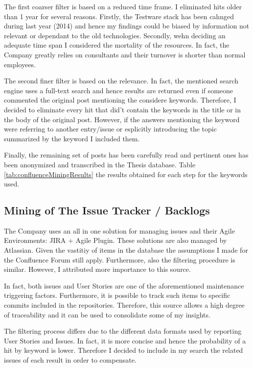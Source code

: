 The first coarser filter is based on a reduced time frame. I eliminated hits older than 1 year for several reasons. Firstly, the Testware stack has been cahnged during last year (2014) and hence my findings could be biased by information not relevant or dependant to the old technologies. Secondly, wehn deciding an adequate time span I considered the mortality of the resources. In fact, the Company greatly relies on consultants and their turnover is shorter than normal employees.

The second finer filter is based on the relevance. In fact, the mentioned search engine uses a full-text search and hence results are returned even if someone commented the original post mentioning the considere keywords. Therefore, I decided to eliminate every hit that did't contain the keywords in the title or in the body of the original post. However, if the answers mentioning the keyword were referring to another entry/issue or esplicitly introducing the topic summarized by the keyword I included them.

Finally, the remaining set of posts has been carefully read and pertinent ones has been anonymized and transcribed in the Thesis database. Table \ref{tab:confluenceMiningResults} the results obtained for each step for the keywords used.



\subsection{Mining of The Issue Tracker / Backlogs}

The Company uses an all in one solution for managing issues and their Agile Environments: JIRA + Agile Plugin. These solutions are also managed by Atlassian. Given the vastitiy of items in the database the assumptions I made for the Confluence Forum still apply. Furthermore, also the filtering procedure is similar. However, I attributed more importance to this source.

In fact, both issues and User Stories are one of the aforementioned maintenance triggering factors. Furthermore, it is possible to track such items to specific commits included in the repositories. Therefore, this source allows a high degree of traceability and it can be used to consolidate some of my insights.

The filtering process differs due to the different data formats used by reporting User Stories and Issues. In fact, it is more concise and hence the probability of a hit by keyword is lower. Therefore I decided to include in my search the related issues of each result in order to compensate.

